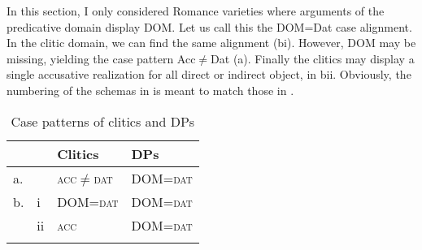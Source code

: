 \documentclass[output=paper,colorlinks,citecolor=brown,nonflat]{./langscibook}
\begin{document}
In this section, I only considered Romance varieties where arguments of the predicative domain display DOM. Let us call this the DOM=Dat case alignment. In the clitic domain, we can find the same alignment (bi). However, DOM may be missing, yielding the case pattern Acc${\neq}$Dat (a). Finally the clitics may display a single accusative realization for all direct or indirect object, in bii. Obviously, the numbering of the schemas in  is meant to match those in .
%

\begin{table}
 \caption{\label{extab:manzini:30}Case patterns of clitics and DPs}
 \begin{tabular}{llll}
 \lsptoprule
    &    & Clitics        & DPs     \\
 \midrule
 a. &    & \textsc{acc}${\neq}$\textsc{dat} & DOM=\textsc{dat} \\
 b. & i  & DOM=\textsc{dat}       & DOM=\textsc{dat} \\
    & ii & \textsc{acc}            & DOM=\textsc{dat} \\
 \lspbottomrule
 \end{tabular}
 \end{table}
\end{document}
